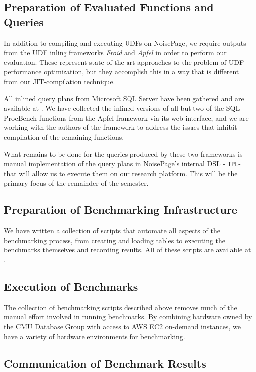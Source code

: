 \documentclass{vldb}
\newcommand{\tpl}{\texttt{TPL}\xspace}
\begin{document}
\subsection{Preparation of Evaluated Functions and Queries} 

In addition to compiling and executing UDFs on NoisePage, we require outputs from the UDF inling frameworks \textit{Froid} \cite{froid} and \textit{Apfel} \cite{apfel} in order to perform our evaluation. These represent state-of-the-art approaches to the problem of UDF performance optimization, but they accomplish this in a way that is different from our JIT-compilation technique.

All inlined query plans from Microsoft SQL Server have been gathered and are available at \cite{udf-jit}. We have collected the inlined versions of all but two of the SQL ProcBench functions from the Apfel framework via its web interface, and we are working with the authors of the framework to address the issues that inhibit compilation of the remaining functions.

What remains to be done for the queries produced by these two frameworks is manual implementation of the query plans in NoisePage's internal DSL - \tpl - that will allow us to execute them on our research platform. This will be the primary focus of the remainder of the semester.

\subsection{Preparation of Benchmarking Infrastructure} 

We have written a collection of scripts that automate all aspects of the benchmarking process, from creating and loading tables to executing the benchmarks themselves and recording results. All of these scripts are available at \cite{udf-jit}. 

\subsection{Execution of Benchmarks} 

The collection of benchmarking scripts described above removes much of the manual effort involved in running benchmarks. By combining hardware owned by the CMU Database Group with access to AWS EC2 on-demand instances, we have a variety of hardware environments for benchmarking.

\subsection{Communication of Benchmark Results} 
\end{document}
